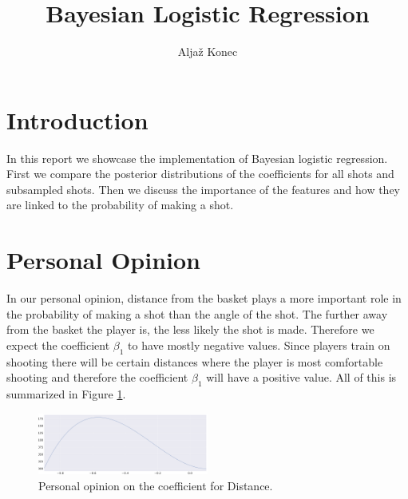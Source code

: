 \documentclass[9pt]{IEEEtran}
\title{\vspace{0ex} Bayesian Logistic Regression}
\author{Aljaž Konec\vspace{-5.0ex}}
\begin{document}
\maketitle

\section{Introduction}
In this report we showcase the implementation of Bayesian logistic regression. 
First we compare the posterior distributions of the coefficients for all shots and subsampled shots.
Then we discuss the importance of the features and how they are linked to the probability of making a shot.

\vspace*{-0.5cm}
\section{Personal Opinion}
\vspace*{-1ex}
In our personal opinion, distance from the basket plays a more important role in the probability of making a shot than the angle of the shot.
The further away from the basket the player is, the less likely the shot is made.
Therefore we expect the coefficient $\beta_1$ to have mostly negative values.
Since players train on shooting there will be certain distances where the player is most comfortable shooting and therefore the coefficient $\beta_1$ will have a positive value.
All of this is summarized in Figure \ref{fig:personal_opinion}.
\begin{figure}[H]
    \centering
    \includegraphics[width=0.5\textwidth]{personal_opinion.pdf}
    \caption{Personal opinion on the coefficient for Distance.}
    \label{fig:personal_opinion}
\end{figure}
\end{document}
